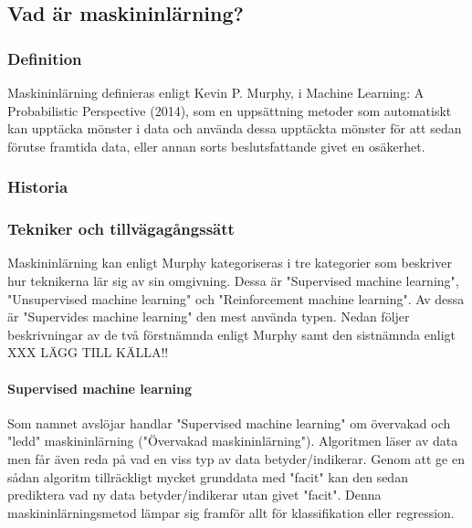 \documentclass[a4paper]{article}
\begin{document}
\subsection{Vad är maskininlärning?}

\subsubsection{Definition}
Maskininlärning definieras enligt Kevin P. Murphy, i Machine Learning: A Probabilistic Perspective (2014), som en uppsättning metoder som automatiskt kan upptäcka mönster i data och använda dessa upptäckta mönster för att sedan förutse framtida data, eller annan sorts beslutsfattande givet en osäkerhet.

\subsubsection{Historia}


\subsubsection{Tekniker och tillvägagångssätt}

Maskininlärning kan enligt Murphy kategoriseras i tre kategorier som beskriver hur teknikerna lär sig av sin omgivning. Dessa är "Supervised machine learning", "Unsupervised machine learning" och "Reinforcement machine learning". Av dessa är "Supervides machine learning" den mest använda typen. Nedan följer beskrivningar av de två förstnämnda enligt Murphy samt den sistnämnda enligt XXX LÄGG TILL KÄLLA!!

\paragraph{Supervised machine learning}

Som namnet avslöjar handlar "Supervised machine learning" om övervakad och "ledd" maskininlärning ("Övervakad maskininlärning"). Algoritmen läser av data men får även reda på vad en viss typ av data betyder/indikerar. Genom att ge en sådan algoritm tillräckligt mycket grunddata med "facit" kan den sedan prediktera vad ny data betyder/indikerar utan givet "facit". Denna maskininlärningsmetod lämpar sig framför allt för klassifikation eller regression. 
\end{document}
